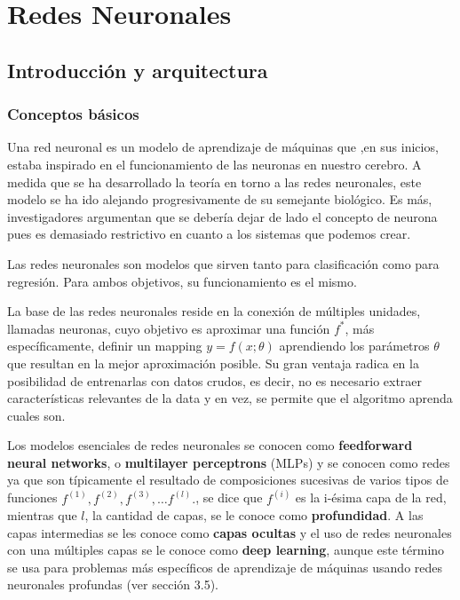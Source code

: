 
\newpage
\section{Redes Neuronales}

\subsection{Introducción y arquitectura}

\subsubsection{Conceptos básicos}

Una red neuronal es un modelo de aprendizaje de máquinas que ,en sus inicios, estaba inspirado en el funcionamiento de las neuronas en nuestro cerebro. A medida que se ha desarrollado la teoría en torno a las redes neuronales, este modelo se ha ido alejando progresivamente de su semejante biológico. Es más, investigadores argumentan que se debería dejar de lado el concepto de neurona pues es demasiado restrictivo en cuanto a los sistemas que podemos crear. 

Las redes neuronales son modelos que sirven tanto para clasificación como para regresión. Para ambos objetivos, su funcionamiento es el mismo. 

La base de las redes neuronales reside en la conexión de múltiples unidades, llamadas neuronas, cuyo objetivo es aproximar una función $f^{*}$, más específicamente, definir un mapping $y = f(x;\theta)$ aprendiendo los parámetros $\theta$ que resultan en la mejor aproximación posible. Su gran ventaja radica en la posibilidad de entrenarlas con datos crudos, es decir, no es necesario extraer características relevantes de la data y en vez, se permite que el algoritmo aprenda cuales son.

Los modelos esenciales de redes neuronales se conocen como \textbf{feedforward neural networks}, o \textbf{multilayer perceptrons} (MLPs) y se conocen como redes ya que son típicamente el resultado de composiciones sucesivas de varios tipos de funciones $f^{(1)},f^{(2)},f^{(3)}, \dots f^{(l)} .$, se dice que $f^{(i)}$ es la i-ésima capa de la red, mientras que $l$, la cantidad de capas, se le conoce como \textbf{profundidad}. A las capas intermedias se les conoce como \textbf{capas ocultas} y el uso de redes neuronales con una múltiples capas se le conoce como \textbf{deep learning}, aunque este término se usa para problemas más específicos de aprendizaje de máquinas usando redes neuronales profundas (ver sección 3.5).

